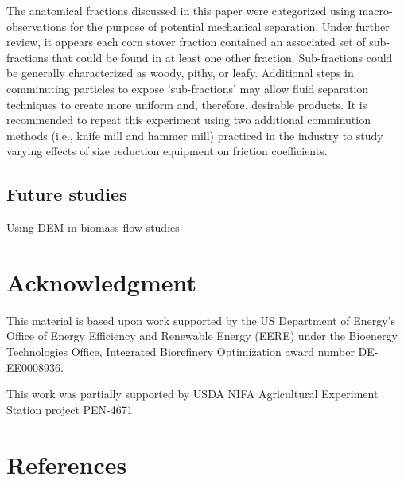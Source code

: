\documentclass[xcolor=dvipsnames,10pt,hidelinks]{article}
\let\oldsubsection\subsection
\renewcommand{\subsection}{\clearpage\oldsubsection}
\begin{document}
The anatomical fractions discussed in this paper were categorized using macro-observations for the purpose of potential mechanical separation.
Under further review, it appears each corn stover fraction contained an associated set of sub-fractions that could be found in at least one other fraction.
Sub-fractions could be generally characterized as woody, pithy, or leafy.
Additional steps in comminuting particles to expose 'sub-fractions' may allow fluid separation techniques to create more uniform and, therefore, desirable products.
It is recommended to repeat this experiment using two additional comminution methods (i.e., knife mill and hammer mill) practiced in the industry to study varying effects of size reduction equipment on friction coefficients.
\subsection{Future studies}
\label{sec:orgf715ef9}
Using DEM in biomass flow studies
\section{Acknowledgment}
\label{sec:orgc65f100}
This material is based upon work supported by the US Department of Energy's Office of Energy Efficiency and Renewable Energy (EERE) under the Bioenergy Technologies Office, Integrated Biorefinery Optimization award number DE-EE0008936.

This work was partially supported by USDA NIFA Agricultural Experiment Station project PEN-4671.
\section{References}
\label{sec:orge1314f0}
\printbibliography
\end{document}

